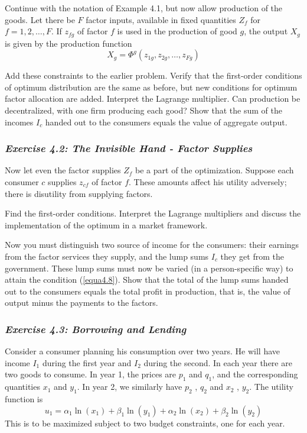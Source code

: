 Continue with the notation of Example 4.1, but now allow production of the goods. Let there be $F$ factor inputs, available in fixed quantities $Z_f$ for $ f = 1,2,\dots, F$. If $z_{fg}$ of factor $f$ is used in the production of good $g$, the output $X_g$ is given by the production function
\begin{equation} \label{equa4.16}
  X_g = \Phi^g (z_{1g}, z_{2g}, \dots, z_{Fg})
\end{equation}

Add these constraints to the earlier problem. Verify that the first-order conditions of optimum distribution are the same as before, but new conditions for optimum factor allocation are added. Interpret the Lagrange multiplier. Can production be decentralized, with one firm producing each good? Show that the sum of the incomes $I_c$ handed out to the consumers equals the value of aggregate output.

\subsubsection*{\textit{Exercise 4.2: The Invisible Hand - Factor Supplies}}

Now let even the factor supplies $Z_f$ be a part of the optimization. Suppose each consumer $c$ supplies $z_{cf}$ of factor $f$. These amounts affect his utility adversely; there is disutility from supplying factors.

Find the first-order conditions. Interpret the Lagrange multipliers and discuss the implementation of the optimum in a market framework.

Now you must distinguish two source of income for the consumers: their earnings from the factor services they supply, and the lump sums $I_c$ they get from the government. These lump sums must now be varied (in a person-specific way) to attain the condition (\ref{equa4.8}). Show that the total of the lump sums handed out to the consumers equals the total profit in production, that is, the value of output minus the payments to the factors.

\subsubsection*{\textit{Exercise 4.3: Borrowing and Lending}}

Consider a consumer planning his consumption over two years. He will have income $I_1$ during the first year and $I_2$ during the second. In each year there are two goods to consume. In year 1, the prices are $p_1$ and $q_1$, and the corresponding quantities $x_1$ and $y_1$. In year 2, we similarly have $p_2$ , $q_2$ and $x_2$ , $y_2$. The utility function is
\begin{equation*}
 u_1 = \alpha_1 \ln (x_1) + \beta_1 \ln (y_1) + \alpha_2 \ln (x_2) + \beta_2 \ln (y_2)
\end{equation*}
This is to be maximized subject to two budget constraints, one for each year.

